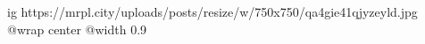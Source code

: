  
 
 
 
 

\ifcmt
  ig https://mrpl.city/uploads/posts/resize/w/750x750/qa4gie41qjyzeyld.jpg
  @wrap center
  @width 0.9
\fi
